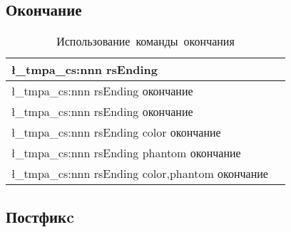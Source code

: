 \ExplSyntaxOff


\subsection{Окончание}

\ExplSyntaxOn
\begin{tcolorbox}
\end{tcolorbox}

\renewcommand{\arraystretch}{1.125}
\begin{table}[ht!]
    \centering
    \begin{tabular}{@{}ll@{}}
        \toprule
        \l_tmpa_cs:nnn { rsEnding } {} { }                        \\ \midrule
        \l_tmpa_cs:nnn { rsEnding } {} { окончание }              \\ \midrule
        \l_tmpa_cs:nnn { rsEnding } {} { окончание }              \\ \midrule
        \l_tmpa_cs:nnn { rsEnding } {color} { окончание }         \\ \midrule
        \l_tmpa_cs:nnn { rsEnding } {phantom} { окончание }       \\ \midrule
        \l_tmpa_cs:nnn { rsEnding } {color,phantom} { окончание } \\ \midrule
        \bottomrule
    \end{tabular}
    \caption{Использование~команды~окончания}
\end{table}

\ExplSyntaxOff


\subsection{Постфикc}

\ExplSyntaxOn

\begin{tcolorbox}
\end{tcolorbox}

